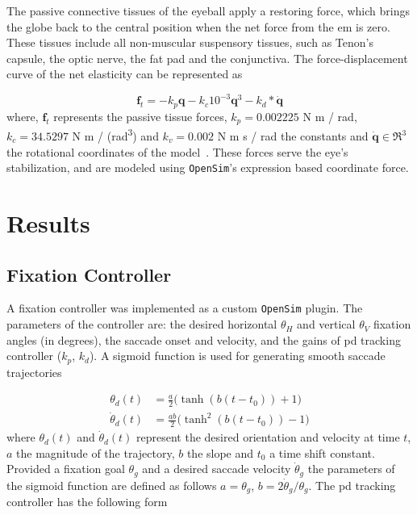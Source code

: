 \documentclass[11pt,a4paper,draft=false]{report}
\renewcommand*{\vec}[1]{\bm{#1}}
\newcommand{\R}[1]{\mathfrak{R}^{#1}}
\newcommand{\inr}[1]{\in\R{#1}}
\begin{document}
The passive connective tissues of the eyeball apply a restoring force, which
brings the globe back to the central position when the net force from the
\gls{em} is zero. These tissues include all non-muscular suspensory tissues,
such as Tenon’s capsule, the optic nerve, the fat pad and the conjunctiva. The
force-displacement curve of the net elasticity can be represented as

\begin{equation}\label{equ:passive-tissue}
  \vec{f}_t = -k_p \vec{q} - k_c 10^{-3} \vec{q}^3 - k_d * \vec{\dot{q}}
\end{equation}
% 
where, $\vec{f}_t$ represents the passive tissue forces, $k_p= 0.002225$ N m /
rad, $k_c= 34.5297$ N m / (rad\textsuperscript{3}) and $k_v= 0.002$ N m s / rad
the constants and $\vec{\dot{q}} \inr{3}$ the rotational coordinates of the
model~\cite{Collins1981}. These forces serve the eye’s stabilization, and are
modeled using \texttt{OpenSim}'s expression based coordinate force.


\section*{Results}\label{sec:results}

\subsection*{Fixation Controller}\label{sec:fixation-controller}

A fixation controller was implemented as a custom \texttt{OpenSim} plugin. The
parameters of the controller are: the desired horizontal $\theta_H$ and vertical
$\theta_V$ fixation angles (in degrees), the saccade onset and velocity, and the
gains of \gls{pd} tracking controller ($k_p$, $k_d $). A sigmoid function is
used for generating smooth saccade trajectories

\begin{equation}\label{equ:sigmoid}
  \begin{aligned}
    \theta_d(t) &= \frac{a}{2} \Big(\tanh(b (t - t_0)) + 1\Big) \\
    \dot{\theta}_d(t) &= \frac{a b}{2} \Big(\tanh^2(b (t - t_0)) - 1\Big) 
  \end{aligned}
\end{equation}
%
where $\theta_d(t)$ and $\dot{\theta}_d(t)$ represent the desired orientation
and velocity at time $t$, $a$ the magnitude of the trajectory, $b$ the slope and
$t_0$ a time shift constant. Provided a fixation goal $\theta_g$ and a desired
saccade velocity $\dot{\theta}_g$ the parameters of the sigmoid function are
defined as follows $a = \theta_g$, $b = 2 \dot{\theta}_g / \theta_g$. The
\gls{pd} tracking controller has the following form
\end{document}
